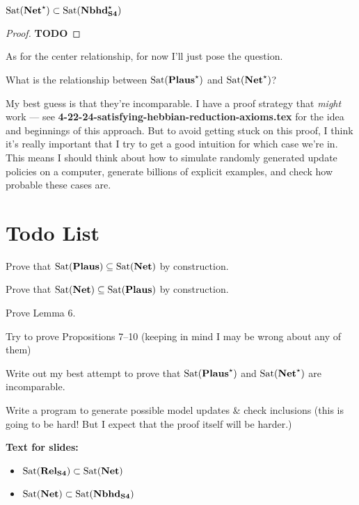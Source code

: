 \documentclass[letterpaper]{article}
\begin{document}
\begin{proposition}
    $\mathrm{Sat}( \textrm{\textbf{Net}}^\star ) \subset \mathrm{Sat}( \textrm{\textbf{Nbhd}}_\textrm{\textbf{S4}}^\star )$
\end{proposition}
\begin{proof}
    \textbf{TODO}
\end{proof}

As for the center relationship, for now I'll just pose the question. 
\begin{question}
    What is the relationship between $\mathrm{Sat}( \textrm{\textbf{Plaus}}^\star )$ and $\mathrm{Sat}( \textrm{\textbf{Net}}^\star )$?
\end{question}
My best guess is that they're incomparable.  I have a proof strategy that \emph{might} work --- see \textbf{4-22-24-satisfying-hebbian-reduction-axioms.tex} for the idea and beginnings of this approach.  But to avoid getting stuck on this proof, I think it's really important that I try to get a good intuition for which case we're in.  This means I should think about how to simulate randomly generated update policies on a computer, generate billions of explicit examples, and check how probable these cases are.

\section*{Todo List}
\begin{todolist}
    \item Prove that $\mathrm{Sat}( \textrm{\textbf{Plaus}} ) \subseteq \mathrm{Sat}( \textrm{\textbf{Net}} )$ by construction.
    \item Prove that $\mathrm{Sat}( \textrm{\textbf{Net}} ) \subseteq \mathrm{Sat}( \textrm{\textbf{Plaus}} )$ by construction.
    \item Prove Lemma 6.
    \item Try to prove Propositions 7--10 (keeping in mind I may be wrong about any of them)
    \item Write out my best attempt to prove that $\mathrm{Sat}( \textrm{\textbf{Plaus}}^\star )$ and $\mathrm{Sat}( \textrm{\textbf{Net}}^\star )$ are incomparable.
    \item Write a program to generate possible model updates \& check inclusions (this is going to be hard!  But I expect that the proof itself will be harder.)
\end{todolist}

\textbf{Text for slides:}
\begin{itemize}
    \item $\mathrm{Sat}( \textrm{\textbf{Rel}}_\textrm{\textbf{S4}} ) \subset \mathrm{Sat}( \textrm{\textbf{Net}} )$
    \item $\mathrm{Sat}( \textrm{\textbf{Net}} ) \subset \mathrm{Sat}( \textrm{\textbf{Nbhd}}_\textrm{\textbf{S4}} )$
\end{itemize}
\end{document}
